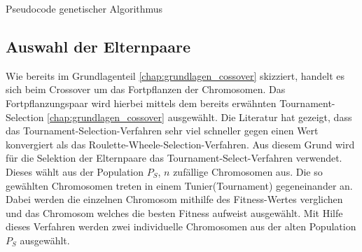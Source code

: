 \begin{algorithm}[H]
	\begin{algorithmic}[1]
%		
		
		 				
		 
	 	\ENDFOR
		\ENDFOR
		\ELSE
		\ENDIF
	\ENDWHILE
	\caption{Pseudocode genetischer Algorithmus}
	\label{code:pseudocode_genetic_algo}
\end{algorithmic}
\end{algorithm}

\subsection{Auswahl der Elternpaare}

Wie bereits im Grundlagenteil \ref{chap:grundlagen_cossover} skizziert, handelt es sich beim Crossover um das Fortpflanzen der Chromosomen.
Das Fortpflanzungspaar wird hierbei mittels dem bereits erwähnten Tournament-Selection \ref{chap:grundlagen_cossover} ausgewählt. Die Literatur \cite{zhong2005comparison} hat gezeigt, dass das Tournament-Selection-Verfahren sehr viel schneller gegen einen Wert konvergiert als das Roulette-Wheele-Selection-Verfahren. Aus diesem Grund wird für die Selektion der Elternpaare das Tournament-Select-Verfahren verwendet. Dieses wählt aus der Population $P_S$, $n$ zufällige Chromosomen aus. Die so gewählten Chromosomen treten in einem \glqq Tunier\grqq(Tournament) gegeneinander an. Dabei werden die einzelnen Chromosom mithilfe des Fitness-Wertes verglichen und das Chromosom welches die besten Fitness aufweist ausgewählt. Mit Hilfe dieses Verfahren werden zwei individuelle Chromosomen aus der alten Population $P_S$ ausgewählt.
 

